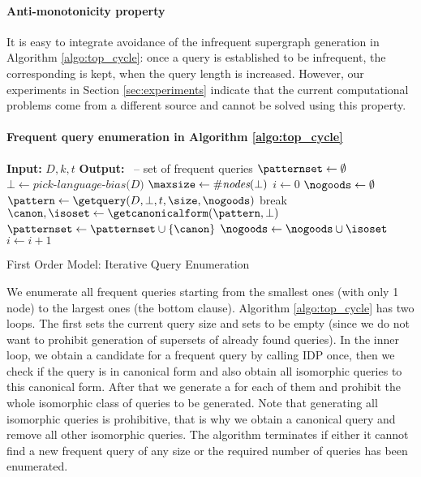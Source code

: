 \paragraph{Anti-monotonicity property} It is easy to integrate avoidance of the infrequent supergraph generation in Algorithm \ref{algo:top_cycle}: once a query is established to be infrequent, the corresponding \mic{} is kept, when the query length is increased. However, our experiments in Section \ref{sec:experiments} indicate that the current computational problems come from a different source and cannot be solved using this property.
\vspace{-5pt}

  
\paragraph{Frequent query enumeration in Algorithm \ref{algo:top_cycle}}
\begin{algorithm}[thb]
  \begin{algorithmic}
    \footnotesize
    \State \textbf{Input:} $D,k,t$ 
    \State \textbf{Output:} \patternset~-- set of frequent queries
    \State $\patternset \gets \emptyset$
    \State $\bot \gets \textit{pick-language-bias(D)}$ 
    \State $\maxsize \gets \#\textit{nodes}(\bot)$
    \State $i \gets 0$
    \For{$\size \in 1\dots\maxsize$}
    \State $\nogoods \gets \emptyset$
     \label{algo:line:while}
    \State $\pattern \gets \getquery(D,\bot,t,\size,\nogoods)$ 
    \State break 
  \EndIf 
  \State $\canon, \isoset \gets \getcanonicalform(\pattern, \bot)$ 
  \State $\patternset \gets \patternset \cup \{\canon\}$
  \State $\nogoods \gets \nogoods \cup \isoset$
  \State $i \gets i + 1$ 
  \Return \patternset
\EndIf
  \EndWhile
\EndFor\\
\Return \patternset
\end{algorithmic}
\caption{First Order Model: Iterative Query Enumeration}
\label{algo:top_cycle}
\end{algorithm}
We enumerate all frequent queries starting from the smallest ones (with only 1 node) to the largest ones (the bottom clause). Algorithm \ref{algo:top_cycle} has two loops. The first sets the current query size and sets \mic to be empty (since we do not want to prohibit generation of supersets of already found queries). In the inner loop, we obtain a candidate for a frequent query by calling IDP once, then we check if the query is in canonical form and also obtain all isomorphic queries to this canonical form. After that we generate a \mic for each of them and prohibit the whole isomorphic class of queries to be generated. Note that generating all isomorphic queries is prohibitive, that is why we obtain a canonical query and remove all other isomorphic queries. The algorithm terminates if either it cannot find a new frequent query of any size or the required number of queries has been enumerated. 

